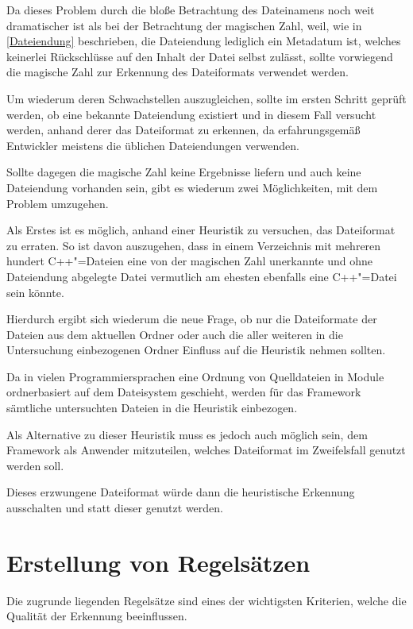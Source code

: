             Da dieses Problem durch die bloße Betrachtung des Dateinamens noch weit dramatischer ist als bei der Betrachtung der magischen Zahl,
            weil,
            wie in
            \vref{Dateiendung} beschrieben,
            die Dateiendung lediglich ein Metadatum ist,
            welches keinerlei Rückschlüsse auf den Inhalt der Datei selbst zulässt,
            sollte vorwiegend die magische Zahl zur Erkennung des Dateiformats verwendet werden.

            Um wiederum deren Schwachstellen auszugleichen,
            sollte im ersten Schritt geprüft werden,
            ob eine bekannte Dateiendung existiert und
            in diesem Fall versucht werden,
            anhand derer das Dateiformat zu erkennen,
            da erfahrungsgemäß Entwickler meistens die üblichen Dateiendungen verwenden.

            Sollte dagegen die magische Zahl keine Ergebnisse liefern und
            auch keine Dateiendung vorhanden sein,
            gibt es wiederum zwei Möglichkeiten,
            mit dem Problem umzugehen.

            Als Erstes ist es möglich,
            anhand einer Heuristik zu versuchen,
            das Dateiformat zu erraten.
            So ist davon auszugehen,
            dass in einem Verzeichnis mit mehreren hundert C++"=Dateien eine von der magischen Zahl unerkannte und
            ohne Dateiendung abgelegte Datei vermutlich am ehesten ebenfalls eine C++"=Datei sein könnte.

            Hierdurch ergibt sich wiederum die neue Frage,
            ob nur die Dateiformate der Dateien aus dem aktuellen Ordner oder
            auch die aller weiteren in die Untersuchung einbezogenen Ordner Einfluss auf die Heuristik nehmen sollten.

            Da in vielen Programmiersprachen eine Ordnung von Quelldateien in Module ordnerbasiert auf dem Dateisystem geschieht,
            werden für das Framework sämtliche untersuchten Dateien in die Heuristik einbezogen.

            Als Alternative zu dieser Heuristik muss es jedoch auch möglich sein,
            dem Framework als Anwender mitzuteilen,
            welches Dateiformat im Zweifelsfall genutzt werden soll.

            Dieses erzwungene Dateiformat würde dann die heuristische Erkennung ausschalten und
            statt dieser genutzt werden.

    \section{Erstellung von Regelsätzen}\label{Erstellung Regelsaetze}
        Die zugrunde liegenden Regelsätze sind eines der wichtigsten Kriterien,
        welche die Qualität der Erkennung beeinflussen.

